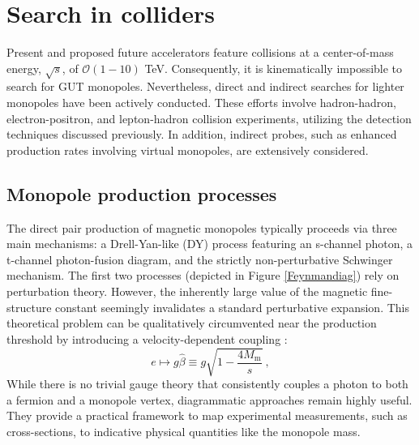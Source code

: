 \documentclass[a4paper,11pt]{article}
\begin{document}
\section{Search in colliders}
Present and proposed future accelerators feature collisions at a center-of-mass energy, $\sqrt{s}$, of $\mathcal{O}(1-10)$ TeV. Consequently, it is kinematically impossible to search for GUT monopoles. Nevertheless, direct and indirect searches for lighter monopoles have been actively conducted. These efforts involve hadron-hadron, electron-positron, and lepton-hadron collision experiments, utilizing the detection techniques discussed previously. In addition, indirect probes, such as enhanced production rates involving virtual monopoles, are extensively considered.  

\subsection{Monopole production processes}
The direct pair production of magnetic monopoles typically proceeds via three main mechanisms: a Drell-Yan-like (DY) process featuring an s-channel photon, a t-channel photon-fusion diagram, and the strictly non-perturbative Schwinger mechanism. The first two processes (depicted in Figure \ref{Feynmandiag}) rely on perturbation theory. However, the inherently large value of the magnetic fine-structure constant seemingly invalidates a standard perturbative expansion. This theoretical problem can be qualitatively circumvented near the production threshold by introducing a velocity-dependent coupling \cite{Baines2018}:
\begin{equation}\label{runningcoupling}
    e\mapsto g\hat \beta \equiv g \sqrt{1-\frac{4M_{\text{m}}}{s}}\ , 
\end{equation}
While there is no trivial gauge theory that consistently couples a photon to both a fermion and a monopole vertex, diagrammatic approaches remain highly useful. They provide a practical framework to map experimental measurements, such as cross-sections, to indicative physical quantities like the monopole mass.
\end{document}

